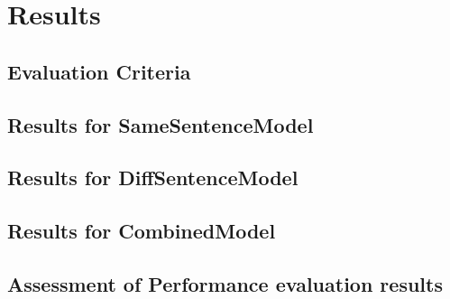 \chapter{Results}\label{chapter:results}

\section{Evaluation Criteria} \label{sec:evaluationCriteria}


\section{Results for SameSentenceModel}

\section{Results for DiffSentenceModel}

\section{Results for CombinedModel}

\section{Assessment of Performance evaluation results}


